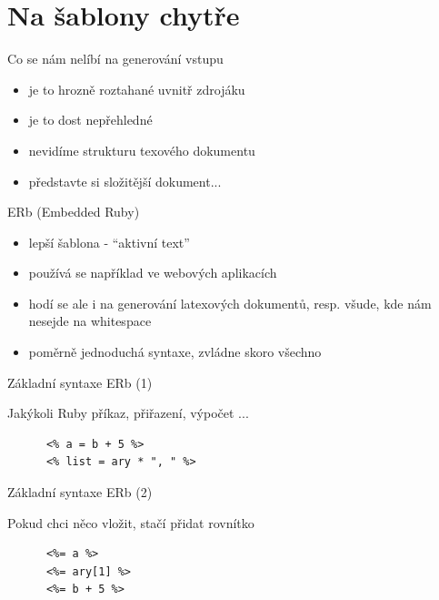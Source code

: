 \documentclass{beamer}
\begin{document}
\section{Na šablony chytře}

\begin{frame}{Co se nám nelíbí na generování vstupu}
  \begin{itemize}
    \item je to hrozně roztahané uvnitř zdrojáku
    \item je to dost nepřehledné
    \item nevidíme strukturu texového dokumentu
    \item představte si složitější dokument...
  \end{itemize}
\end{frame}

\begin{frame}{ERb (Embedded Ruby)}
  \begin{itemize}
    \item lepší šablona - ``aktivní text''
    \item používá se například ve webových aplikacích
    \item hodí se ale i na generování latexových dokumentů, resp. všude, kde nám nesejde na whitespace
    \item poměrně jednoduchá syntaxe, zvládne skoro všechno
  \end{itemize}
\end{frame}

\begin{frame}[fragile]{Základní syntaxe ERb (1)}
  \begin{block}{ }
    Jakýkoli Ruby příkaz, přiřazení, výpočet ...
    \scriptsize
    \begin{verbatim}
      <% a = b + 5 %>
      <% list = ary * ", " %>
    \end{verbatim}
  \end{block}
\end{frame}

\begin{frame}[fragile]{Základní syntaxe ERb (2)}
  \begin{block}{ }
    Pokud chci něco vložit, stačí přidat rovnítko
    \scriptsize
    \begin{verbatim}
      <%= a %>
      <%= ary[1] %>
      <%= b + 5 %>
    \end{verbatim}
  \end{block}
\end{frame}
\end{document}
